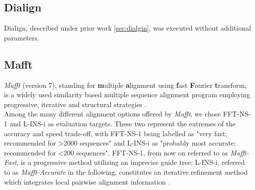 \subsection{Dialign}
Dialign, described under prior work \ref{sec:dialgin}, was executed without additional parameters.

\subsection{Mafft}
\textit{Mafft} (version 7), standing for \textbf{m}ultiple \textbf{a}lignment using \textbf{f}ast \textbf{F}ourier \textbf{t}ransform, is a widely used similarity based multiple sequence alignment program employing progressive, iterative and structural strategies \cite{katoh2013mafft}.\\
Among the many different alignment options offered by \textit{Mafft}, we chose FFT-NS-1 and L-INS-i as evaluation targets. These two represent the extremes of the accuracy and speed trade-off, with FFT-NS-1 being labelled as "very fast; recommended for >2000 sequences" and L-INS-i as "probably most accurate; recommended for <200 sequences". FFT-NS-1, from now on referred to as \textit{Mafft-Fast}, is a progressive method utilizing an imprecise guide tree; L-INS-i, referred to as \textit{Mafft-Accurate} in the following, constitutes an iterative refinement method which integrates local pairwise alignment information \cite{katoh2013mafft}.

